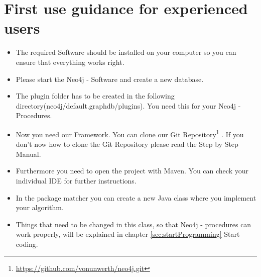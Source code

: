 \section {First use guidance for experienced users} \label{sec:beforeFirstUse}
\begin{itemize}
	\item The required Software should be installed on your computer so you can ensure that everything works right.
	\item Please start the Neo4j - Software and create a new database. 
	\item The plugin folder has to be created in the following directory(neo4j/default.graphdb/plugins). You need this for your \glqq  Neo4j - Procedures\grqq{}.
	\item Now you need our Framework. You can clone our \glqq Git Repository\footnote{\url{https://github.com/vonunwerth/neo4j.git}} \grqq{}. If you don't now how to clone the \glqq Git Repository\grqq{} please read the Step by Step Manual.
	\item Furthermore you need to open the project with Maven. You can check your individual IDE for further instructions.
	\item In the package \glqq matcher\grqq{} you can create a new Java class where you implement your algorithm.
	\item Things that need to be changed in this class, so that \glqq Neo4j - procedures\grqq{} can work properly, will be explained in chapter \ref{sec:startProgramming} \glqq Start coding\grqq{}. 
\end{itemize}

